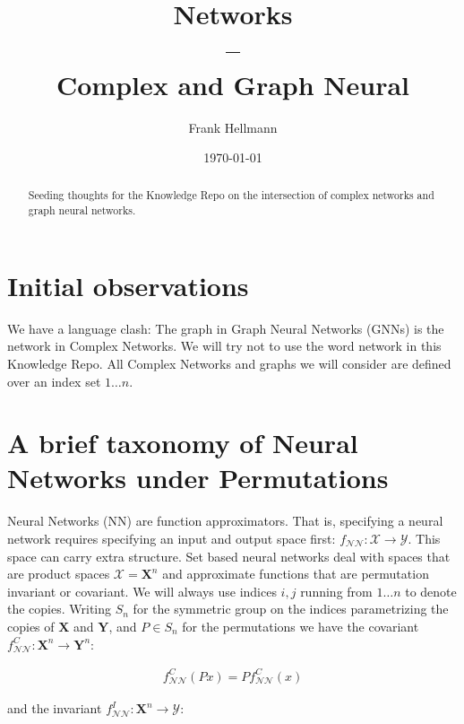 \documentclass[reprint,twocolumn,amsmath,amssymb,aps]{revtex4-1}
\newcommand{\NN}{\mathcal{NN}}
\newcommand{\XX}{\mathcal{X}}
\newcommand{\YY}{\mathcal{Y}}
\newcommand{\X}{\mathbf{X}}
\newcommand{\Y}{\mathbf{Y}}
\begin{document}
\title{Networks \\--\\ Complex and Graph Neural}%

\author{Frank Hellmann}

\date{\today}

\begin{abstract}
Seeding thoughts for the Knowledge Repo on the intersection of complex networks and graph neural networks.
\end{abstract}

\maketitle

\section{Initial observations}

We have a language clash: The graph in Graph Neural Networks (GNNs) is the network in Complex Networks. We will try not to use the word network in this Knowledge Repo. All Complex Networks and graphs we will consider are defined over an index set $1 \dots n$.

\section{A brief taxonomy of Neural Networks under Permutations}

Neural Networks (NN) are function approximators. That is, specifying a neural network requires specifying an input and output space first: $f_\NN: \XX \rightarrow \YY$. This space can carry extra structure. Set based neural networks deal with spaces that are product spaces $\XX = \X^n$ and approximate functions that are permutation invariant or covariant. We will always use indices $i, j$ running from $1 \dots n$ to denote the copies. Writing $S_n$ for the symmetric group on the indices parametrizing the copies of $\X$ and $\Y$, and $P \in S_n$ for the permutations we have the covariant $f^C_\NN: \X^n \rightarrow \Y^n$:

\begin{align}
f^C_\NN(P x) = P f^C_\NN(x)
\end{align}

and the invariant $f^I_\NN: \X^n \rightarrow \YY$:
\end{document}

